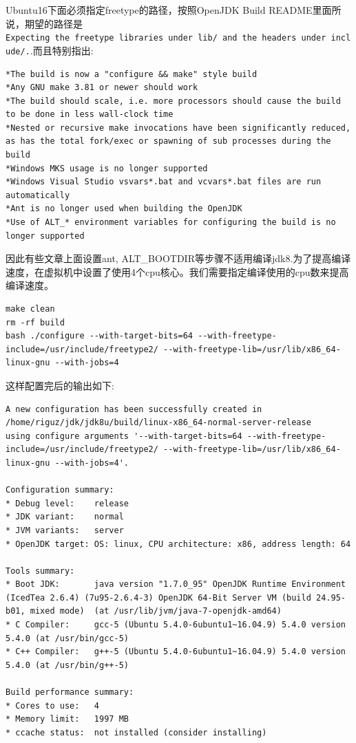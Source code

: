 \documentclass[12pt]{article}
\begin{document}
Ubuntu16下面必须指定freetype的路径，按照OpenJDK Build README里面所说，期望的路径是\texttt{Expecting\ the\ freetype\ libraries\ under\ lib/\ and\ the\ headers\ under\ include/.}.而且特别指出:

\begin{verbatim}
*The build is now a "configure && make" style build
*Any GNU make 3.81 or newer should work
*The build should scale, i.e. more processors should cause the build to be done in less wall-clock time
*Nested or recursive make invocations have been significantly reduced, as has the total fork/exec or spawning of sub processes during the build
*Windows MKS usage is no longer supported
*Windows Visual Studio vsvars*.bat and vcvars*.bat files are run automatically
*Ant is no longer used when building the OpenJDK
*Use of ALT_* environment variables for configuring the build is no longer supported
\end{verbatim}

因此有些文章上面设置ant, ALT\_BOOTDIR等步骤不适用编译jdk8.为了提高编译速度，在虚拟机中设置了使用4个cpu核心。我们需要指定编译使用的cpu数来提高编译速度。

\begin{verbatim}
make clean
rm -rf build
bash ./configure --with-target-bits=64 --with-freetype-include=/usr/include/freetype2/ --with-freetype-lib=/usr/lib/x86_64-linux-gnu --with-jobs=4
\end{verbatim}

这样配置完后的输出如下:

\begin{verbatim}
A new configuration has been successfully created in
/home/riguz/jdk/jdk8u/build/linux-x86_64-normal-server-release
using configure arguments '--with-target-bits=64 --with-freetype-include=/usr/include/freetype2/ --with-freetype-lib=/usr/lib/x86_64-linux-gnu --with-jobs=4'.

Configuration summary:
* Debug level:    release
* JDK variant:    normal
* JVM variants:   server
* OpenJDK target: OS: linux, CPU architecture: x86, address length: 64

Tools summary:
* Boot JDK:       java version "1.7.0_95" OpenJDK Runtime Environment (IcedTea 2.6.4) (7u95-2.6.4-3) OpenJDK 64-Bit Server VM (build 24.95-b01, mixed mode)  (at /usr/lib/jvm/java-7-openjdk-amd64)
* C Compiler:     gcc-5 (Ubuntu 5.4.0-6ubuntu1~16.04.9) 5.4.0 version 5.4.0 (at /usr/bin/gcc-5)
* C++ Compiler:   g++-5 (Ubuntu 5.4.0-6ubuntu1~16.04.9) 5.4.0 version 5.4.0 (at /usr/bin/g++-5)

Build performance summary:
* Cores to use:   4
* Memory limit:   1997 MB
* ccache status:  not installed (consider installing)
\end{verbatim}
\end{document}
